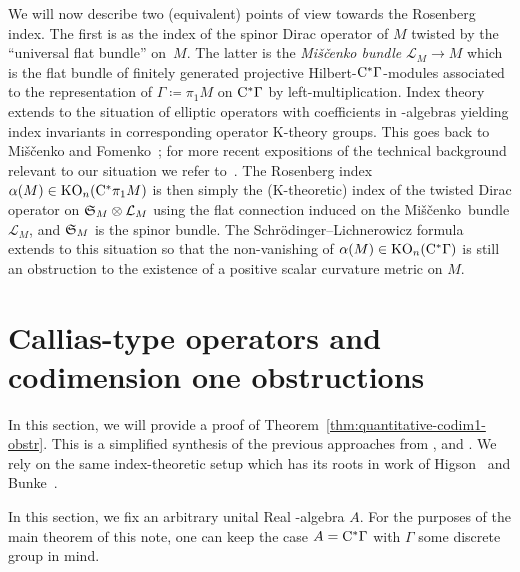 \documentclass[11pt]{article}
\numberwithin{equation}{section}
\newcommand*{\Mishchenko}{Mi\v{s}\v{c}enko}
\begin{document}
We will now describe two (equivalent) points of view towards the Rosenberg index.
The first is as the index of the spinor Dirac operator of \(M\) twisted by the ``universal flat bundle'' on~\(M\).
The latter is the \emph{Mi\v{s}\v{c}enko bundle} \(\mathcal{L}_M \to M\) which is the flat bundle of finitely generated projective Hilbert-\(\mathrm{C}^\ast \Gamma\)-modules associated to the representation of \(\Gamma \coloneqq \pi_1 M\) on \(\mathrm{C}^\ast \Gamma\) by left-multiplication.
Index theory extends to the situation of elliptic operators with coefficients in \textCstar-algebras yielding index invariants in corresponding operator K-theory groups.
This goes back to Mi\v{s}\v{c}enko and Fomenko~\cite{Mishchenko-Fomenko:Index}; for more recent expositions of the technical background relevant to our situation we refer to~\cite{Ebert:EllipticRegularityDirac,HankePapeSchick:CodimensionTwoIndex}.
The Rosenberg index \(\alpha(M) \in \operatorname{KO}_n(\mathrm{C}^\ast \pi_1 M)\) is then simply the (K-theoretic) index of the twisted Dirac operator on \(\mathfrak{S}_M \otimes \mathcal{L}_M\) using the flat connection induced on the \Mishchenko\ bundle \(\mathcal{L}_M\), and \(\mathfrak{S}_M\) is the spinor bundle.
The Schr\"odinger--Lichnerowicz formula extends to this situation so that the non-vanishing of \(\alpha(M) \in \operatorname{KO}_n(\mathrm{C}^\ast \Gamma)\) is still an obstruction to the existence of a positive scalar curvature metric on \(M\).

\setcounter{section}{2}
\setcounter{subsection}{0}
\setcounter{subsubsection}{0}
\setcounter{Theorem}{4}
\setcounter{equation}{1}
\section{Callias-type operators and codimension one obstructions} \label{sec:codim-1-obstr}
In this section, we will provide a proof of Theorem~\ref{thm:quantitative-codim1-obstr}.
This is a simplified synthesis of the previous approaches from \cite{Cecchini:CalliasTypePSC}, \cite[Section~6]{Cecchini:LongNeck} and \cite[Section~2]{Zeidler:band-width-estimates}.
We rely on the same index-theoretic setup which has its roots in work of Higson~\cite{Higson:CobordismInvariance} and Bunke~\cite{Bunke:RelativeIndexCallias}.

In this section, we fix an arbitrary unital Real \textCstar-algebra \(A\).
For the purposes of the main theorem of this note, one can keep the case \(A = \mathrm{C}^\ast \Gamma\) with \(\Gamma\) some discrete group in mind.
\end{document}
